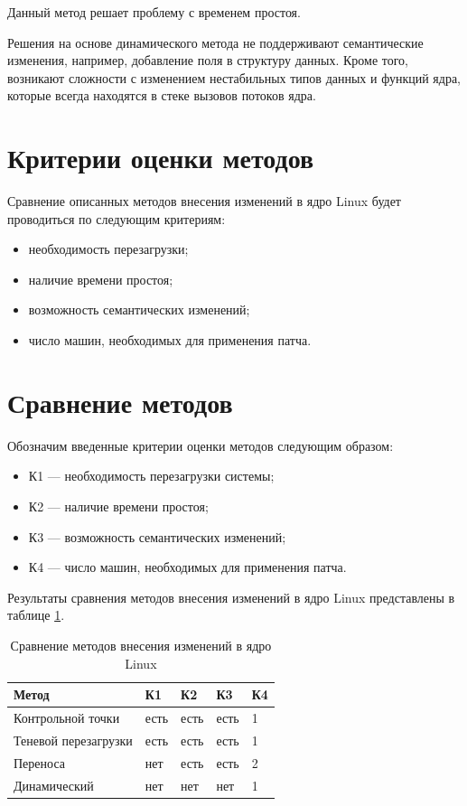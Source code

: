 Данный метод решает проблему с временем простоя.

Решения на основе динамического метода не поддерживают семантические изменения, например, добавление поля в структуру данных. Кроме того, возникают сложности с изменением нестабильных типов данных и функций ядра, которые всегда находятся в стеке вызовов потоков ядра.

\section{Критерии оценки методов}

Сравнение описанных методов внесения изменений в ядро Linux будет проводиться по следующим критериям:

\begin{itemize}
	\item необходимость перезагрузки;
	\item наличие времени простоя;
	\item возможность семантических изменений;
	\item число машин, необходимых для применения патча.
\end{itemize}

\section{Сравнение методов}

Обозначим введенные критерии оценки методов следующим образом:

\begin{itemize}
	\item К1 --- необходимость перезагрузки системы;
	\item К2 --- наличие времени простоя;
	\item К3 --- возможность семантических изменений;
	\item К4 --- число машин, необходимых для применения патча.
\end{itemize}

Результаты сравнения методов внесения изменений в ядро Linux представлены в таблице \ref{tab:comparison}.

\begin{table}[h]
    \caption{Сравнение методов внесения изменений в ядро Linux}
    \begin{center}
        \begin{tabular}{|l|l|l|l|l|}
            \hline
            Метод & К1 & К2 & К3 & К4 \\ \hline
            Контрольной точки & есть & есть & есть & 1 \\ \hline
            Теневой перезагрузки & есть & есть & есть & 1 \\ \hline
            Переноса & нет & есть & есть & 2 \\ \hline
            Динамический & нет & нет & нет & 1 \\ \hline
        \end{tabular}
    \end{center}
    \label{tab:comparison}
\end{table}

